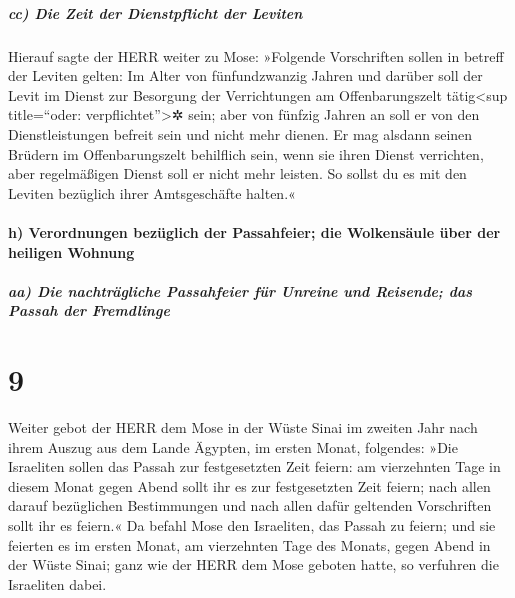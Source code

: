 \hypertarget{cc-die-zeit-der-dienstpflicht-der-leviten}{%
\subparagraph{cc) Die Zeit der Dienstpflicht der
Leviten}\label{cc-die-zeit-der-dienstpflicht-der-leviten}}

Hierauf sagte der HERR weiter zu Mose:
»Folgende Vorschriften sollen in betreff der Leviten
gelten: Im Alter von fünfundzwanzig Jahren und darüber soll der Levit im
Dienst zur Besorgung der Verrichtungen am Offenbarungszelt
tätig\textless sup title=``oder: verpflichtet''\textgreater✲ sein;
aber von fünfzig Jahren an soll er von den
Dienstleistungen befreit sein und nicht mehr dienen. Er
mag alsdann seinen Brüdern im Offenbarungszelt behilflich sein, wenn sie
ihren Dienst verrichten, aber regelmäßigen Dienst soll er nicht mehr
leisten. So sollst du es mit den Leviten bezüglich ihrer Amtsgeschäfte
halten.«

\hypertarget{h-verordnungen-bezuxfcglich-der-passahfeier-die-wolkensuxe4ule-uxfcber-der-heiligen-wohnung}{%
\paragraph{h) Verordnungen bezüglich der Passahfeier; die Wolkensäule
über der heiligen
Wohnung}\label{h-verordnungen-bezuxfcglich-der-passahfeier-die-wolkensuxe4ule-uxfcber-der-heiligen-wohnung}}

\hypertarget{aa-die-nachtruxe4gliche-passahfeier-fuxfcr-unreine-und-reisende-das-passah-der-fremdlinge}{%
\subparagraph{aa) Die nachträgliche Passahfeier für Unreine und
Reisende; das Passah der
Fremdlinge}\label{aa-die-nachtruxe4gliche-passahfeier-fuxfcr-unreine-und-reisende-das-passah-der-fremdlinge}}

\hypertarget{section-8}{%
\section{9}\label{section-8}}

Weiter gebot der HERR dem Mose in der Wüste Sinai im
zweiten Jahr nach ihrem Auszug aus dem Lande Ägypten, im ersten Monat,
folgendes: »Die Israeliten sollen das Passah zur
festgesetzten Zeit feiern: am vierzehnten Tage in diesem
Monat gegen Abend sollt ihr es zur festgesetzten Zeit feiern; nach allen
darauf bezüglichen Bestimmungen und nach allen dafür geltenden
Vorschriften sollt ihr es feiern.« Da befahl Mose den
Israeliten, das Passah zu feiern; und sie feierten es im
ersten Monat, am vierzehnten Tage des Monats, gegen Abend in der Wüste
Sinai; ganz wie der HERR dem Mose geboten hatte, so verfuhren die
Israeliten dabei.

